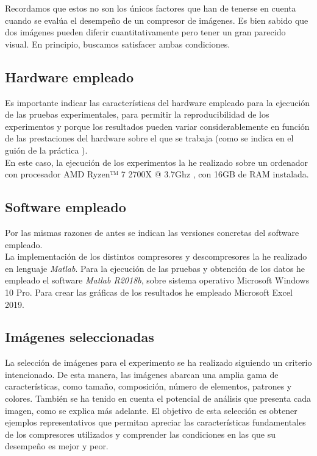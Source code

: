 \documentclass[12pt,a4paper]{article}
\begin{document}
Recordamos que estos no son los únicos factores que han de tenerse en cuenta cuando se evalúa el desempeño de un compresor de imágenes. Es bien sabido que dos imágenes pueden diferir cuantitativamente pero tener un gran parecido visual. En principio, buscamos satisfacer ambas condiciones.

\subsection{Hardware empleado}
Es importante indicar las características del hardware empleado para la ejecución de las pruebas experimentales, para permitir la reproducibilidad de los experimentos y porque los resultados pueden variar considerablemente en función de las prestaciones del hardware sobre el que se trabaja (como se indica en el guión de la práctica \cite{guion}).\\

En este caso, la ejecución de los experimentos la he realizado sobre un ordenador con procesador AMD Ryzen™ 7 2700X @ 3.7Ghz , con 16GB de RAM instalada.


\subsection{Software empleado}
Por las mismas razones de antes se indican las versiones concretas del software empleado.\\

La implementación de los distintos compresores y descompresores la he realizado en lenguaje \textit{Matlab}. Para la ejecución de las pruebas y obtención de los datos he empleado el software \textit{Matlab R2018b}, sobre sistema operativo Microsoft Windows 10 Pro. Para crear las gráficas de los resultados he empleado Microsoft Excel 2019.

\subsection{Imágenes seleccionadas}
La selección de imágenes para el experimento se ha realizado siguiendo un criterio intencionado. De esta manera, las imágenes abarcan una amplia gama de características, como tamaño, composición, número de elementos, patrones y colores. También se ha tenido en cuenta el potencial de análisis que presenta cada imagen, como se explica más adelante. El objetivo de esta selección es obtener ejemplos representativos que permitan apreciar las características fundamentales de los compresores utilizados y comprender las condiciones en las que su desempeño es mejor y peor.\\
\end{document}
